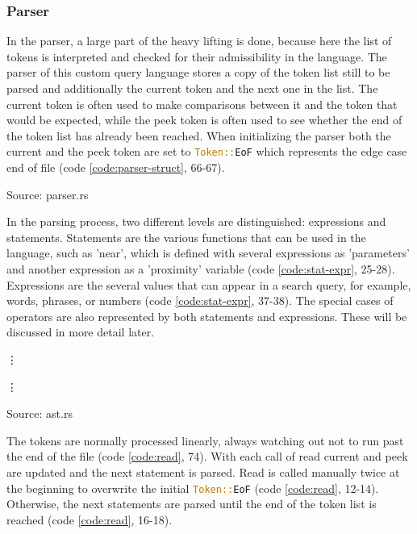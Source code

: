 \subsubsection{Parser}
In the parser, a large part of the heavy lifting is done, because here the list of tokens is interpreted and checked for their admissibility in the language. The parser of this custom query language stores a copy of the token list still to be parsed and additionally the current token and the next one in the list. The current token is often used to make comparisons between it and the token that would be expected, while the peek token is often used to see whether the end of the token list has already been reached. When initializing the parser both the current and the peek token are set to \lstinline[language=Rust]$Token::EoF$ which represents the edge case end of file (code \ref{code:parser-struct}, 66-67).
\begin{codeenv}
    \label{code:parser-struct}
    
    \centerline{Source: parser.rs}
\end{codeenv}
In the parsing process, two different levels are distinguished: expressions and statements. Statements are the various functions that can be used in the language, such as 'near', which is defined with several expressions as 'parameters' and another expression as a 'proximity' variable (code \ref{code:stat-expr}, 25-28). Expressions are the several values that can appear in a search query, for example, words, phrases, or numbers (code \ref{code:stat-expr}, 37-38). The special cases of operators are also represented by both statements and expressions. These will be discussed in more detail later.
\begin{codeenv}
    \label{code:stat-expr}
    
    \vdots
    
    \vdots
    
    \centerline{Source: ast.rs}
\end{codeenv}
The tokens are normally processed linearly, always watching out not to run past the end of the file (code \ref{code:read}, 74). With each call of read current and peek are updated and the next statement is parsed. Read is called manually twice at the beginning to overwrite the initial \lstinline[language=Rust]$Token::EoF$ (code \ref{code:read}, 12-14). Otherwise, the next statements are parsed until the end of the token list is reached (code \ref{code:read}, 16-18).
